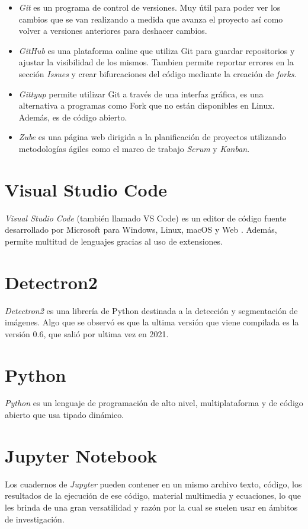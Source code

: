 \begin{itemize}
\item \textit{Git} es un programa de control de versiones. 
Muy útil para poder ver los cambios que se van realizando a medida que avanza el proyecto así como volver a versiones anteriores para deshacer cambios.

\item \textit{GitHub} es una plataforma online que utiliza Git para guardar repositorios y ajustar la visibilidad de los mismos. Tambien permite reportar errores en la sección \textit{Issues} y crear bifurcaciones del código mediante la creación de \textit{forks}. 

\item \textit{Gittyup} permite utilizar Git a través de una interfaz gráfica, es una alternativa a programas como Fork que no están disponibles en Linux. Además, es de código abierto.

\item \textit{Zube} es una página web dirigida a la planificación de proyectos utilizando metodologías ágiles como el marco de trabajo \textit{Scrum} y \textit{Kanban}.
\end{itemize}

\section{Visual Studio Code}
\textit{Visual Studio Code} (también llamado VS Code) es un editor de código fuente desarrollado por Microsoft para Windows, Linux, macOS y Web \cite{wiki:visualstudiocode}. Además, permite multitud de lenguajes gracias al uso de extensiones.

\section{Detectron2}
\textit{Detectron2} es una librería de Python destinada a la detección y segmentación de imágenes. Algo que se observó es que la ultima versión que viene compilada es la versión 0.6, que salió por ultima vez en 2021. 

\section{Python}
\textit{Python} es un lenguaje de programación de alto nivel, multiplataforma y de código abierto que usa tipado dinámico.

\section{Jupyter Notebook}
Los cuadernos de \textit{Jupyter} pueden contener en un mismo archivo texto, código, los resultados de la ejecución de ese código, material multimedia y ecuaciones, lo que les brinda de una gran versatilidad y razón por la cual se suelen usar en ámbitos de investigación.

